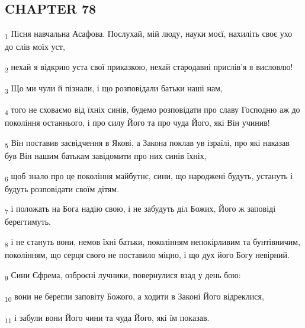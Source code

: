 \subsection{CHAPTER 78}
\begin{tcolorbox}
\textsubscript{1} Пісня навчальна Асафова. Послухай, мій люду, науки моєї, нахиліть своє ухо до слів моїх уст,
\end{tcolorbox}
\begin{tcolorbox}
\textsubscript{2} нехай я відкрию уста свої приказкою, нехай стародавні прислів'я я висловлю!
\end{tcolorbox}
\begin{tcolorbox}
\textsubscript{3} Що ми чули й пізнали, і що розповідали батьки наші нам,
\end{tcolorbox}
\begin{tcolorbox}
\textsubscript{4} того не сховаємо від їхніх синів, будемо розповідати про славу Господню аж до покоління останнього, і про силу Його та про чуда Його, які Він учинив!
\end{tcolorbox}
\begin{tcolorbox}
\textsubscript{5} Він поставив засвідчення в Якові, а Закона поклав ув ізраїлі, про які наказав був Він нашим батькам завідомити про них синів їхніх,
\end{tcolorbox}
\begin{tcolorbox}
\textsubscript{6} щоб знало про це покоління майбутнє, сини, що народжені будуть, устануть і будуть розповідати своїм дітям.
\end{tcolorbox}
\begin{tcolorbox}
\textsubscript{7} і положать на Бога надію свою, і не забудуть діл Божих, Його ж заповіді берегтимуть.
\end{tcolorbox}
\begin{tcolorbox}
\textsubscript{8} і не стануть вони, немов їхні батьки, поколінням непокірливим та бунтівничим, поколінням, що серця свого не поставило міцно, і що дух його Богу невірний.
\end{tcolorbox}
\begin{tcolorbox}
\textsubscript{9} Сини Єфрема, озброєні лучники, повернулися взад у день бою:
\end{tcolorbox}
\begin{tcolorbox}
\textsubscript{10} вони не берегли заповіту Божого, а ходити в Законі Його відреклися,
\end{tcolorbox}
\begin{tcolorbox}
\textsubscript{11} і забули вони Його чини та чуда Його, які їм показав.
\end{tcolorbox}
